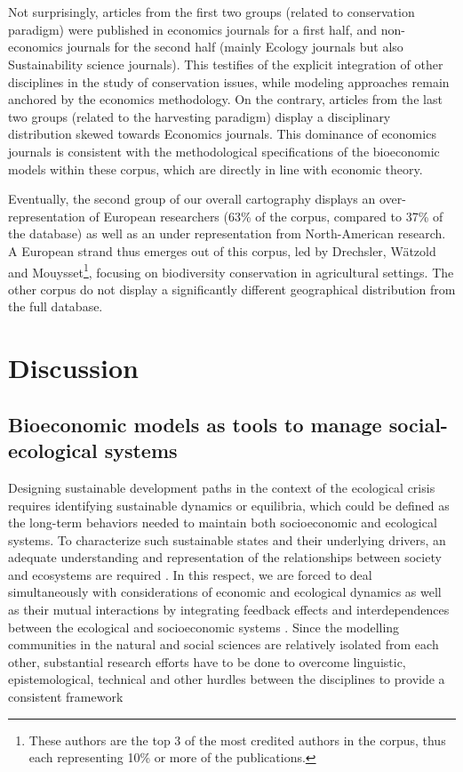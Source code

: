 \\\\
Not surprisingly, articles from the first two groups (related to conservation paradigm) were published in economics journals for a first half, and non-economics journals for the second half (mainly Ecology journals but also Sustainability science journals). This testifies of the explicit integration of other disciplines in the study of conservation issues, while modeling approaches remain anchored by the economics methodology. On the contrary, articles from the last two groups (related to the harvesting paradigm) display a disciplinary distribution  skewed towards Economics journals. This dominance of economics journals is consistent with the methodological specifications of the bioeconomic models within these corpus, which are directly in line with economic theory. 

Eventually, the second group of our overall cartography displays an over-representation of European researchers (63\% of the corpus, compared to 37\% of the database) as well as an under representation from North-American research. A European strand thus emerges out of this corpus, led by Drechsler, Wätzold and Mouysset\footnote{These authors are the top 3 of the most credited authors in the corpus, %
thus each representing 10\% or more of the publications.}, focusing on biodiversity conservation in agricultural settings. The other corpus do not display a significantly different geographical distribution from the full database. 


\section{Discussion}

\subsection{Bioeconomic models as tools to manage social-ecological systems}

Designing sustainable development paths in the context of the ecological crisis requires identifying sustainable dynamics or equilibria, which could be defined
as the long-term behaviors needed to maintain both socioeconomic and ecological systems. To characterize such sustainable states and their underlying drivers, an adequate understanding and representation of the relationships between society and ecosystems are required \citep{IPBES2016}. In this respect, we are forced to deal simultaneously with considerations of economic and ecological dynamics as
well as their mutual interactions by integrating feedback effects and interdependences between the ecological and socioeconomic systems \citep{Carpenter2009, Figueiredo2011, Perrings2011}. Since the  modelling communities in the natural and social sciences are relatively isolated from each other, substantial research efforts have to be done to overcome linguistic, epistemological, technical and other hurdles between the disciplines to provide a consistent framework \citep{Rindfuss2004}

